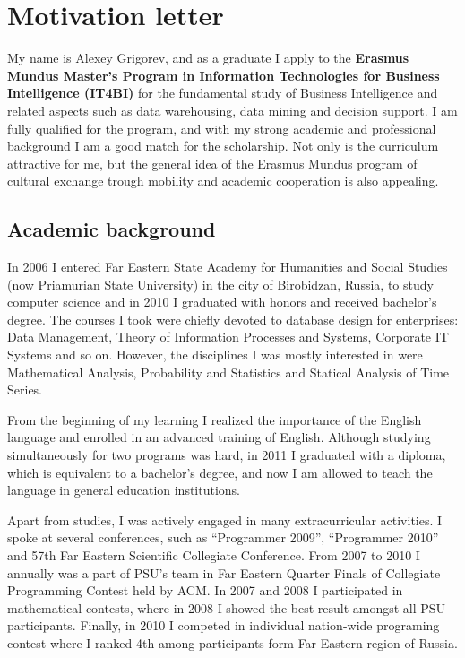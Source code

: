 \documentclass[a4paper,12pt]{article}
\begin{document}
\section*{Motivation letter}

My name is Alexey Grigorev, and as a graduate I apply to the \textbf{Erasmus Mundus Master's Program in Information Technologies for Business Intelligence (IT4BI)} for the fundamental study of Business Intelligence and related aspects such as data warehousing, data mining and decision support. I am fully qualified for the program, and with my strong academic and professional background I am a good match for the scholarship. Not only is the curriculum attractive for me, but the general idea of the Erasmus Mundus program of cultural exchange trough mobility and academic cooperation is also appealing.

\subsection*{Academic background}

In 2006 I entered Far Eastern State Academy for Humanities and Social Studies (now Priamurian State University) in the city of Birobidzan, Russia, to study computer science and in 2010 I graduated with honors and received bachelor's degree. The courses I took were chiefly devoted to database design for enterprises: Data Management, Theory of Information Processes and Systems, Corporate IT Systems and so on. However, the disciplines I was mostly interested in were Mathematical Analysis, Probability and Statistics and Statical Analysis of Time Series.

From the beginning of my learning I realized the importance of the English language and enrolled in an advanced training of English. Although studying simultaneously for two programs was hard, in 2011 I graduated with a diploma, which is equivalent to a bachelor's degree, and now I am allowed to teach the language in general education institutions.

Apart from studies, I was actively engaged in many extracurricular activities. I spoke at several conferences, such as ``Programmer 2009'', ``Programmer 2010'' and 57th Far Eastern Scientific Collegiate Conference. From 2007 to 2010 I annually was a part of PSU's team in Far Eastern Quarter Finals of Collegiate Programming Contest held by ACM. In 2007 and 2008 I participated in mathematical contests, where in 2008 I showed the best result amongst all PSU participants. Finally, in 2010 I competed in individual nation-wide programing contest where I ranked 4th among participants form Far Eastern region of Russia.
\end{document}
